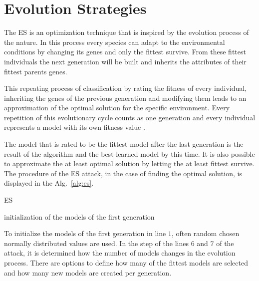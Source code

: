 \section{Evolution Strategies}
\label{sec:evolutionstrategies}

The \acf{ES} is an optimization technique that is inspired by the evolution process of the nature.
In this process every species can adapt to the environmental conditions by changing its genes and only the fittest survive.
From these fittest individuals the next generation will be built and inherits the attributes of their fittest parents genes. %

This repeating process of classification by rating the fitness of every individual, inheriting the genes of the previous generation and modifying them leads to an approximation of the optimal solution for the specific environment.
Every repetition of this evolutionary cycle counts as one generation and every individual represents a model with its own fitness value	\cite{Becker2015ThePUFs}. %

The model that is rated to be the fittest model after the last generation is the result of the algorithm and the best learned model by this time.
It is also possible to approximate the at least optimal solution by letting the at least fittest survive. %
The procedure of the \ac{ES} attack, in the case of finding the optimal solution, is displayed in the Alg.\ \ref{alg:es}.

\SetAlCapHSkip{0.2em}
\begin{algorithm}[ht] %
\Indm
\SetAlgoLined
\caption{\acl{ES}}
\label{alg:es}
\Indp

initialization of the models of the first generation\\
\end{algorithm}

To initialize the models of the first generation in line $1$, often random chosen normally distributed values are used.
In the step of the lines $6$ and $7$ of the attack, it is determined how the number of models changes in the evolution process. %
There are options to define how many of the fittest models are selected and how many new models are created per generation.

